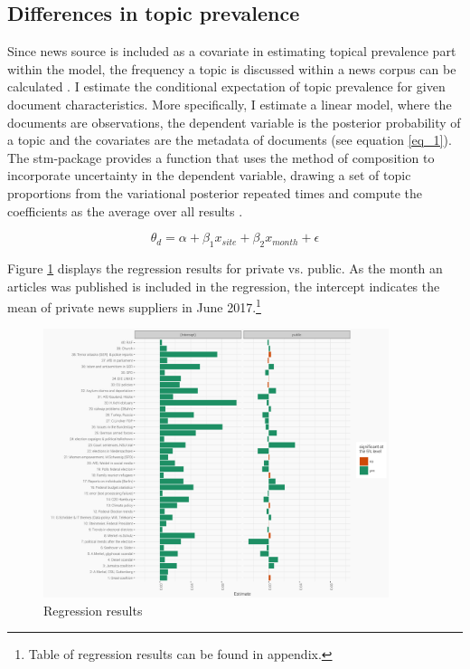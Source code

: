 \documentclass[12pt,a4paper,notitlepage]{article}
\begin{document}
\subsection{Differences in topic prevalence}
Since news source is included as a covariate in estimating topical prevalence part within the model, the frequency a topic is discussed within a news corpus can be calculated \citep{roberts_model_2016}. I estimate the conditional expectation of topic prevalence for given document characteristics. More specifically, I estimate a linear model, where the documents are observations, the dependent variable is the posterior probability of a topic and the covariates are the metadata of documents (see equation \ref{eq_1}). The stm-package provides a function that uses the method of composition to incorporate uncertainty in the dependent variable, drawing a set of topic proportions from the variational posterior repeated times and compute the coefficients as the average over all results \citep{roberts_stm:_2016}. 

\begin{equation}\label{eq_1}
	\theta_d=\alpha+\beta_1x_{site}+\beta_2x_{month}+\epsilon
\end{equation}

Figure \ref{fig_estimateEffects} displays the regression results for private vs. public. As the month an articles was published is included in the regression, the intercept indicates the mean of private news suppliers in June 2017.\footnote{Table of regression results can be found in appendix.}

\begin{figure}[H]
	\caption{Regression results}
		\begin{center}
			\includegraphics[width=0.9\textwidth,keepaspectratio]{../figs/estimates_site.png}
		\end{center}
	\label{fig_estimateEffects}
\end{figure}
\end{document}

